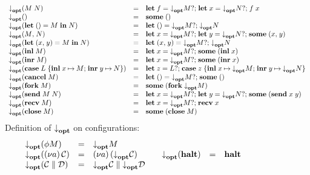 \begin{figure*}
\begin{mdframed}
\begin{highlight}
\[\begin{array}{lcl}
        \atm{\parens{\gvApp{M}{N}}}
        & = & \gvDo{f}{\atm{M}}{{\gvDo{x}{\atm{N}}{\gvApp{f}{x}}}}
        \\
        \atm{\gvUnit}
        & = & \gvSome{\gvUnit}
        \\
        \atm{\parens{\gvLetUnit{M}{N}}}
        & = & \gvDo{\gvUnit}{\atm{M}}{{\atm{N}}}
        \\
        \atm{\gvPair{M}{N}}
        & = & \gvDo{x}{\atm{M}}{{\gvDo{y}{\atm{N}}{{\gvSome{\gvPair{x}{y}}}}}}
        \\
        \atm{\parens{\gvLetPair{x}{y}{M}{N}}}
        & = & \gvDo{\gvPair{x}{y}}{\atm{M}}{\atm{N}}
        \\
        \atm{\parens{\gvInl{M}}}
        & = & \gvDo{x}{\atm{M}}{\gvSome{\parens{\gvInl{x}}}}
        \\
        \atm{\parens{\gvInr{M}}}
        & = & \gvDo{x}{\atm{M}}{\gvSome{\parens{\gvInr{x}}}}
        \\
        \atm{\parens{\gvCaseSum{L}{x}{M}{y}{N}}}
        & = & \gvDo{z}{L}{{\gvCaseSum{z}{x}{\atm{M}}{y}{\atm{N}}}}
        \\
        \atm{\parens{\gvCancel{M}}}
        & = & \gvDo{\gvUnit}{\atm{M}}{\gvSome{\gvUnit}}
        \\
        \atm{\parens{\gvFork{M}}}
        & = & \gvSome{\parens{\gvFork{\atm{M}}}}
        \\
        \atm{\parens{\gvSend{M}{N}}}
        & = & \gvDo{x}{\atm{M}}{{\gvDo{y}{\atm{N}}{\gvSome{\parens{\gvSend{x}{y}}}}}}
        \\
        \atm{\parens{\gvRecv{M}}}
        & = & \gvDo{x}{\atm{M}}{{\gvRecv{x}}}
        \\
        \atm{\parens{\gvClose{M}}}
        & = & \gvSome{\parens{\gvClose{M}}}
      \end{array}
    \]
    Definition of $\relax{{\downarrow}_{\mathbf{opt}}}\relax{}$ on configurations:%
    \[
      \begin{array}{lcl}
        \relax{{\downarrow}_{\mathbf{opt}}}\relax{\relax{(}\ensuremath{\relax{\phi}\relax{M}}\relax{)}}
        & = & \relax{{\downarrow}_{\mathbf{opt}}}\relax{M}
        \\
        \relax{{\downarrow}_{\mathbf{opt}}}\relax{\relax{(}\ensuremath{\relax{(}\relax{\nu}\relax{a}\relax{)}\,\relax{\ensuremath{\relax{\mathcal{C}}}}}\relax{)}}
        & = & \relax{(}\relax{\nu}\relax{a}\relax{)}\,\relax{\relax{(}\ensuremath{\relax{{\downarrow}_{\mathbf{opt}}}\relax{\ensuremath{\relax{\mathcal{C}}}}}\relax{)}}
        \\
        \relax{{\downarrow}_{\mathbf{opt}}}\relax{\relax{(}\ensuremath{\relax{\ensuremath{\relax{\mathcal{C}}}}\;\relax{\parallel}\;\relax{\ensuremath{\relax{\mathcal{D}}}}}\relax{)}}
        & = & \relax{\ensuremath{\relax{{\downarrow}_{\mathbf{opt}}}\relax{\ensuremath{\relax{\mathcal{C}}}}}}\;\relax{\parallel}\;\relax{\ensuremath{\relax{{\downarrow}_{\mathbf{opt}}}\relax{\ensuremath{\relax{\mathcal{D}}}}}}
        \\
      \end{array}
      \quad
      \begin{array}{lcl}
        \relax{{\downarrow}_{\mathbf{opt}}}\relax{\relax{(}\ensuremath{\relax{\mathbf{halt}}}\relax{)}}
        & = & \relax{\mathbf{halt}}

\end{array}\]
\end{highlight}
\end{mdframed}
\end{figure*}
